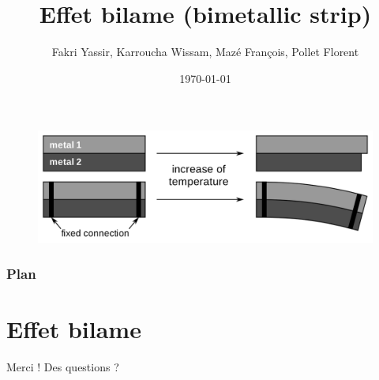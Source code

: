 \documentclass[10pt]{beamer}
\title[Effet bilame]{Effet bilame (bimetallic strip)}
\author[Groupe 4]{Fakri Yassir, Karroucha Wissam, Mazé François, Pollet Florent} %
\institute[Mines Paris] %
{
Mines ParisTech \\ %
}
\date{\today} %
\begin{document}
\begin{frame}
\titlepage %
\begin{figure}
    \centering
    \includegraphics[scale=0.1]{imgs/bilame.png}
\end{figure}
\end{frame}

\begin{frame}
\frametitle{Plan} %
\tableofcontents %
\end{frame}

\section{Effet bilame} %









\begin{frame}
    \Huge{\centerline{Merci ! Des questions ?}}
\end{frame}
    
\end{document}

